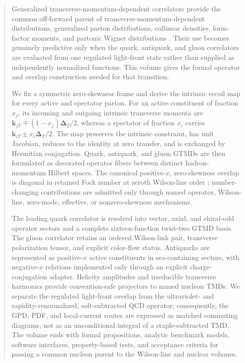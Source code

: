 \documentclass[11pt]{article}
\newcommand{\DT}{\bm{\Delta}_{T}}
\begin{document}
\begin{abstract}
Generalized transverse-momentum-dependent correlators provide the common
off-forward parent of transverse-momentum-dependent distributions,
generalized parton distributions, collinear densities, form-factor moments,
and partonic Wigner distributions \cite{Meissner2009,BelitskyJiYuan2004,LorcePasquini2011}.  Their use becomes genuinely predictive
only when the quark, antiquark, and gluon correlators are evaluated from one
regulated light-front state rather than supplied as independently normalized
functions.  This volume gives the formal operator and overlap construction
needed for that transition.

We fix a symmetric zero-skewness frame and derive the intrinsic recoil map
for every active and spectator parton.  For an active constituent of fraction
\(x_j\), its incoming and outgoing intrinsic transverse momenta are
\(\bm{k}_{jT}\mp(1-x_j)\DT/2\), whereas a spectator of fraction \(x_i\) carries
\(\bm{k}_{iT}\pm x_i\DT/2\).  The map preserves the intrinsic constraint, has unit
Jacobian, reduces to the identity at zero transfer, and is exchanged by
Hermitian conjugation.  Quark, antiquark, and gluon GTMDs are then formulated
as decorated operator fibers between distinct hadron-momentum Hilbert spaces.
The canonical positive-\(x\), zero-skewness overlap is diagonal in retained
Fock number at zeroth Wilson-line order \cite{Diehl2000}; number-changing contributions are
admitted only through named operator, Wilson-line, zero-mode, effective, or
nonzero-skewness mechanisms.

The leading quark correlator is resolved into vector, axial, and chiral-odd
operator sectors and a complete sixteen-function twist-two GTMD basis.  The
gluon correlator retains an ordered Wilson-link pair, transverse polarization
tensor, and explicit color-flow status.  Antiquarks are represented as
positive-\(x\) active constituents in sea-containing sectors, with
negative-\(x\) relations implemented only through an explicit
charge-conjugation adapter.  Helicity amplitudes and irreducible transverse
harmonics provide convention-safe projectors to named nucleon TMDs.  We
separate the regulated light-front overlap from the ultraviolet- and
rapidity-renormalized, soft-subtracted QCD operator; consequently, the GPD,
PDF, and local-current routes are expressed as matched commuting diagrams,
not as an unconditional integral of a staple-subtracted TMD.  The volume ends
with formal propositions, analytic benchmark models, software interfaces,
property-based tests, and acceptance criteria for passing a common nucleon
parent to the Wilson-line and nuclear volumes.
\end{abstract}
\end{document}
